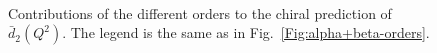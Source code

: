 \documentclass[twocolumn,prc,showpacs,nofootinbib,preprintnumbers,amsmath,amssymb,superscriptaddress]{revtex4-1}
\begin{document}
\begin{figure}[H]
\begin{center} 
\hspace{-0.3cm}\\[0.5cm] \hspace{-0.3cm} 
\caption{Contributions of the different orders to the chiral prediction of $\bar{d}_2(Q^2)$. The legend is the same as in Fig.~\ref{Fig:alpha+beta-orders}. \label{Fig:d2-orders-plot}}
\end{center}
\end{figure}





\end{document}
